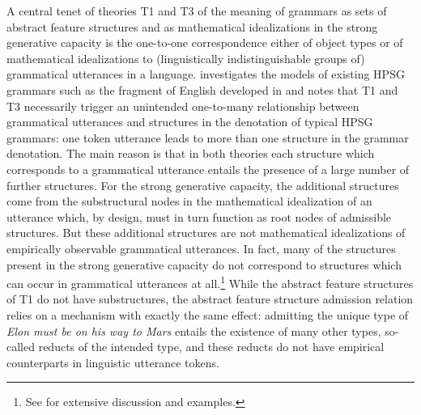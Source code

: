 \documentclass[output=paper
                ,modfonts
                ,nonflat
	        ,collection
	        ,collectionchapter
	        ,collectiontoclongg
 	        ,biblatex
                ,babelshorthands
                ,newtxmath
                ,draftmode
                ,colorlinks, citecolor=brown
]{./langsci/langscibook}
\begin{document}
{{A central tenet of theories T1 and T3 of the meaning of grammars as
sets of abstract feature structures and as mathematical idealizations
in the strong generative capacity is the one-to-one
correspondence either of object types or of mathematical idealizations
to (linguistically indistinguishable groups of) grammatical utterances
in a language. \citet{Richter2007a}
investigates the models of existing HPSG grammars such as the fragment
of English developed in \cite{PollardSag1994} and notes that
T1 and T3 necessarily trigger an unintended one-to-many
relationship between grammatical utterances and structures in the
denotation of typical HPSG grammars: one token utterance leads to more than one
structure in the grammar denotation. The main reason
is that in both theories each structure which corresponds
to a grammatical utterance entails the presence of a large
number of further structures. For the strong generative capacity,
the additional structures come from the substructural nodes in the
mathematical idealization of an utterance which, by design, must
in turn function as root nodes of admissible structures. But these additional
structures are not mathematical idealizations of empirically
observable grammatical utterances. In fact, many of the structures
present in the strong generative capacity do not correspond to
structures which can occur in grammatical utterances at all.\footnote{See
  \cite[Section 4]{Richter2007a} for extensive discussion and 
  examples.} While the abstract feature structures
of T1 do not have substructures, the abstract feature structure admission
relation relies on a mechanism with exactly the same effect: admitting
the unique type of \emph{Elon must be on his way to Mars} entails the existence
of many other types, so-called reducts of the intended
type, and these reducts do not have empirical counterparts in linguistic
utterance tokens.



}}
\end{document}
